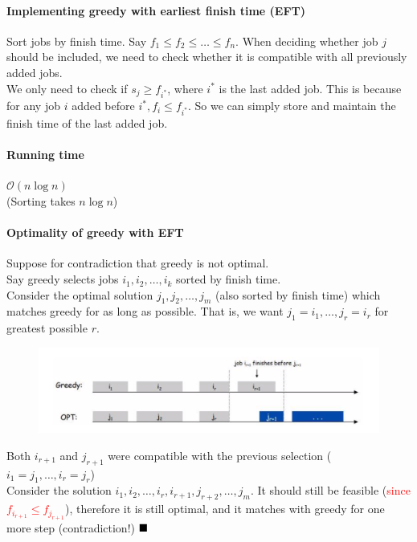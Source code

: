 \documentclass[11pt]{article}
\newcommand{\qed}[0]{$\hfill\blacksquare$}
\begin{document}
\paragraph{Implementing greedy with earliest finish time (EFT)}
Sort jobs by finish time. Say $f_1 \leq f_2 \leq \dots \leq f_n$. When deciding whether job $j$ should be included, we need to check whether it is compatible with all previously added jobs.\\
We only need to check if $s_j \geq f_{i^*}$, where $i^*$ is the last added job. This is because for any job $i$ added before $i^*, f_i \leq f_{i^*}$. So we can simply store and maintain the finish time of the last added job.
\paragraph{Running time}
$\mathcal{O}(n \log n)$ \\
(Sorting takes $n \log n$)

\paragraph{Optimality of greedy with EFT}
Suppose for contradiction that greedy is not optimal. \\
Say greedy selects jobs $i_1, i_2, \hdots, i_k$ sorted by finish time. \\
Consider the optimal solution $j_1, j_2, \hdots, j_m$ (also sorted by finish time) which matches greedy for as long as possible. That is, we want $j_1 = i_1, \hdots, j_r = i_r$ for greatest possible $r$.\\

\begin{figure}[h]
	\centering
	\includegraphics[scale=0.7]{p9}
\end{figure}

\noindent Both $i_{r+1}$ and $j_{r+1}$ were compatible with the previous selection ($i_1 = j_1, \hdots, i_r = j_r$)\\
Consider the solution $i_1, i_2, \hdots, i_r, i_{r+1}, j_{r+2}, \hdots, j_m$. It should still be feasible (\textcolor{red}{since $f_{i_{r+1}} \leq f_{j_{r+1}}$}), therefore it is still optimal, and it matches with greedy for one more step (contradiction!) \qed
\end{document}
